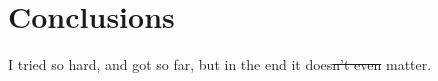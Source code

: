 \chapter[Conclusions]{Conclusions}\label{ch:Conclusions}

I tried so hard, and got so far, but in the end it does\st{n't even} matter.

